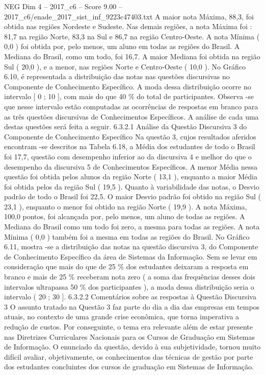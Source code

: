 \begin{textsample}{NEG Dim 4 – 2017\_c6 – Score 9.00 – 2017\_c6/enade\_2017\_sist\_inf\_9223c47403.txt}
A maior nota Máxima, 88,3, foi obtida nas regiões Nordeste e Sudeste.
Nas demais regiões, a nota Máxima foi : 81,7 na região Norte, 83,3 na Sul e 86,7 na região Centro-Oeste.
A nota Mínima ( 0,0 ) foi obtida por, pelo menos, um aluno em todas as regiões do Brasil.
A Mediana do Brasil, como um todo, foi 16,7.
A maior Mediana foi obtida na região Sul ( 20,0 ), e a menor, nas regiões Norte e Centro-Oeste ( 10,0 ).
No Gráfico 6.10, é representada a distribuição das notas nas questões discursivas no Componente de Conhecimento Específico.
A moda dessa distribuição ocorre no intervalo [ 0 ; 10 ], com mais do que 40 \% do total de participantes.
Observa -se que nesse intervalo estão computadas as ocorrências de respostas em branco para as três questões discursivas de Conhecimentos Específicos.
A análise de cada uma destas questões será feita a seguir. 6.3.2.1 Análise da Questão Discursiva 3 do Componente de Conhecimento Específico Na questão 3, cujos resultados aferidos encontram -se descritos na Tabela 6.18, a Média dos estudantes de todo o Brasil foi 17,7, questão com desempenho inferior ao da discursiva 4 e melhor do que o desempenho da discursiva 5 de Conhecimentos Específicos.
A menor Média nessa questão foi obtida pelos alunos da região Norte ( 13,1 ), enquanto a maior Média foi obtida pelos da região Sul ( 19,5 ).
Quanto à variabilidade das notas, o Desvio padrão de todo o Brasil foi 22,5.
O maior Desvio padrão foi obtido na região Sul ( 23,1 ), enquanto o menor foi obtido na região Norte ( 19,9 ).
A nota Máxima, 100,0 pontos, foi alcançada por, pelo menos, um aluno de todas as regiões.
A Mediana do Brasil como um todo foi zero, a mesma para todas as regiões.
A nota Mínima ( 0,0 ) também foi a mesma em todas as regiões do Brasil.
No Gráfico 6.11, mostra -se a distribuição das notas na questão discursiva 3, do Componente de Conhecimento Específico da área de Sistemas da Informação.
Sem se levar em consideração que mais do que de 25 \% dos estudantes deixaram a resposta em branco e mais de 25 \% receberam nota zero ( a soma das frequências desses dois intervalos ultrapassa 50 \% dos participantes ), a moda dessa distribuição seria o intervalo ( 20 ; 30 ]. 6.3.2.2 Comentários sobre as respostas à Questão Discursiva 3 O assunto tratado na Questão 3 faz parte do dia a dia das empresas em tempos atuais, no contexto de uma grande crise econômica, que torna imperativa a redução de custos.
Por conseguinte, o tema era relevante além de estar presente nas Diretrizes Curriculares Nacionais para os Cursos de Graduação em Sistemas de Informação.
O enunciado da questão, devido à sua subjetividade, tornou muito difícil avaliar, objetivamente, os conhecimentos das técnicas de gestão por parte dos estudantes concluintes dos cursos de graduação em Sistemas de Informação.

\end{textsample}
